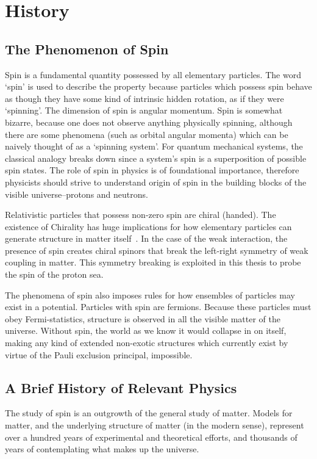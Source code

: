\chapter{History}
\label{ch:history}
\section{The Phenomenon of Spin}

Spin is a fundamental quantity possessed by all elementary particles. The word
`spin' is used to describe the property because particles which possess spin
behave as though they have some kind of intrinsic hidden rotation, as if they
were `spinning'. The dimension of spin is angular momentum. Spin is somewhat
bizarre, because one does not observe anything physically spinning, although
there are some phenomena (such as orbital angular momenta) which can be naively
thought of as a `spinning system'. For quantum mechanical systems, the classical
analogy breaks down since a system's spin is a superposition of possible spin
states.  The role of spin in physics is of foundational importance, therefore
physicists should strive  to understand origin of spin in the building blocks of
the visible universe--protons and neutrons.

Relativistic particles that possess non-zero spin are chiral (handed).  The
existence of Chirality has huge implications for how elementary particles can
generate structure in matter itself~\cite{Brodsky1988}. In the case of the weak
interaction, the presence of spin creates chiral spinors that break the
left-right symmetry of weak coupling in matter. This symmetry breaking is
exploited in this thesis to probe the spin of the proton sea.

The phenomena of spin also imposes rules for how ensembles of particles may
exist in a potential. Particles with spin are fermions. Because these particles
must obey Fermi-statistics, structure is observed in all the visible matter of
the universe. Without spin, the world as we know it would collapse in on itself,
making any kind of extended non-exotic structures which currently exist by
virtue of the Pauli exclusion principal, impossible.

\clearpage
\section{A Brief History of Relevant Physics}

The study of spin is an outgrowth of the general study of matter.  Models
for matter, and the underlying structure of matter (in the modern sense),
represent over a hundred years of experimental and theoretical efforts, and
thousands of years of contemplating what makes up the universe.

